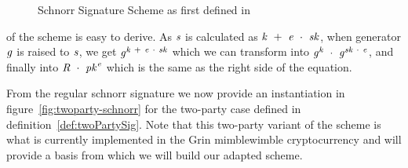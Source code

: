 \begin{figure}
    \begin{center}
        \fbox{
        \begin{varwidth}{\textwidth}
            \procedure[linenumbering]{$\procSetup{\varSecParam}$} {
            \varKey \sample \cnstIntegersPrimeWithoutZero{\varPrime} \\
            \pcreturn (\varSecKey \opAssign \varKey \opSeperate \varPubKey \opAssign \funGen{\varKey})
            }
            \procedure[linenumbering]{$\procSign{\varMsg}{\varSecKey}$}{
            \varNonce \sample \cnstIntegersPrimeWithoutZero{\varPrime} \\
            \varRand \opAssign \funGen{\varNonce} \\
            \varSchnorrChallenge \opAssign \funHash{\varMsg \opConc \varRand \opConc \varPubKey} \\
            \varS \opAssign \varNonce \opAddScalar \varSchnorrChallenge \opTimesScalar \varSecKey \\
            \pcreturn \varSignature \opAssign (\varS, \varRand)
            }
            \procedure[linenumbering]{$\procVerf{\varMsg}{\varSignature}{\varPubKey}$} {
            (\varS \opSeperate \varRand) \opFunResult \varSignature \\
            \varSchnorrChallenge \opAssign \funHash{\varMsg \opConc \varRand \opConc \varPubKey} \\
            \pcreturn \funGen{\varS} \opEq \opPointScalar{\varRand}{\varSchnorrChallenge} \opAddPoint \varPubKey
            }
        \end{varwidth}
        }
    \end{center}
    \caption{Schnorr Signature Scheme as first defined in~\cite{schnorr1989efficient}}
    \label{fig:schnorr}
\end{figure}
\cnstCorrectness of the scheme is easy to derive. As $\mathit{s}$ is calculated as $\mathit{k} ~+~ \mathit{e} ~\cdot~ \mathit{sk}$, when generator $\mathit{g}$ is raised to $\mathit{s}$, we get
$\mathit{g}^{\mathit{k} ~+~ \mathit{e} ~\cdot~ \mathit{sk}}$ which we can transform into $\mathit{g}^{\mathit{k}} ~\cdot~ \mathit{g}^{\mathit{sk} ~\cdot~ \mathit{e}}$, and finally
into $\mathit{R} ~\cdot~ \mathit{pk}^{\mathit{e}}$ which is the same as the right side of the equation.

From the regular schnorr signature we now provide an instantiation in figure~\ref{fig:twoparty-schnorr} for the two-party case defined in definition~\ref{def:twoPartySig}. Note that this two-party variant of the scheme is what is
currently implemented in the Grin mimblewimble cryptocurrency and will provide a basis from which we will build our adapted scheme.


